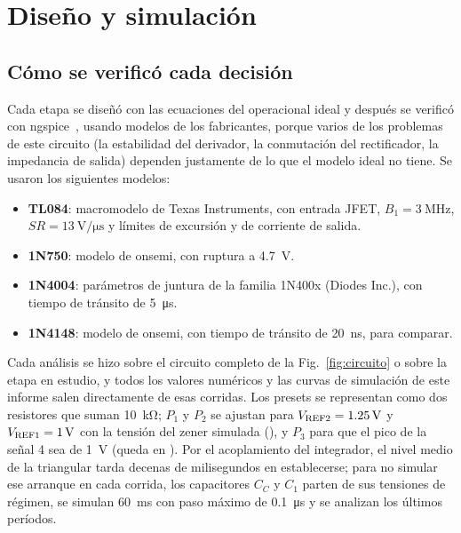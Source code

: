 \section{Diseño y simulación}
\label{sec:diseno}

\subsection{Cómo se verificó cada decisión}
\label{sec:metodo}
Cada etapa se diseñó con las ecuaciones del operacional ideal y después se verificó con ngspice~\cite{ngspice}, usando modelos de los fabricantes, porque varios de los problemas de este circuito (la estabilidad del derivador, la conmutación del rectificador, la impedancia de salida) dependen justamente de lo que el modelo ideal no tiene. Se usaron los siguientes modelos:
\begin{itemize}[leftmargin=*, nosep]
    \item \textbf{TL084}: macromodelo de Texas Instruments, con entrada JFET, $B_1 = \SI{3}{\mega\hertz}$, $SR = \SI{13}{\volt\per\micro\second}$ y límites de excursión y de corriente de salida.
    \item \textbf{1N750}: modelo de onsemi, con ruptura a \SI{4,7}{\volt}.
    \item \textbf{1N4004}: parámetros de juntura de la familia 1N400x (Diodes Inc.), con tiempo de tránsito de \SI{5}{\micro\second}.
    \item \textbf{1N4148}: modelo de onsemi, con tiempo de tránsito de \SI{20}{\nano\second}, para comparar.
\end{itemize}
Cada análisis se hizo sobre el circuito completo de la Fig.~\ref{fig:circuito} o sobre la etapa en estudio, y todos los valores numéricos y las curvas de simulación de este informe salen directamente de esas corridas. Los presets se representan como dos resistores que suman \SI{10}{\kilo\ohm}; $P_1$ y $P_2$ se ajustan para $V_{\mathrm{REF2}} = \SI{1,25}{\volt}$ y $V_{\mathrm{REF1}} = \SI{1}{\volt}$ con la tensión del zener simulada (), y $P_3$ para que el pico de la señal 4 sea de \SI{1}{\volt} (queda en ). Por el acoplamiento del integrador, el nivel medio de la triangular tarda decenas de milisegundos en establecerse; para no simular ese arranque en cada corrida, los capacitores $C_C$ y $C_1$ parten de sus tensiones de régimen, se simulan \SI{60}{\milli\second} con paso máximo de \SI{0,1}{\micro\second} y se analizan los últimos períodos.

